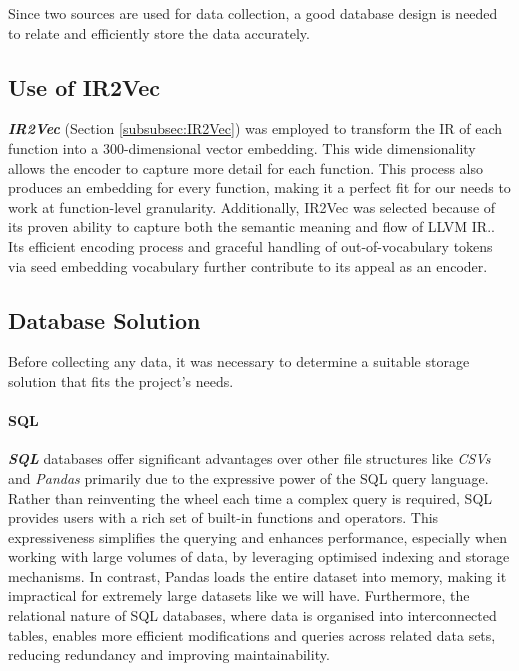 Since two sources are used for data collection, a good database design is needed to relate and efficiently store the data accurately.

\subsection{Use of IR2Vec} \label{subsection:UseOfIR2Vec}
\textbf{\textit{IR2Vec}} (Section \ref{subsubsec:IR2Vec}) was employed to transform the IR of each function into a 300-dimensional vector embedding. This wide dimensionality allows the encoder to capture more detail for each function. This process also produces an embedding for every function, making it a perfect fit for our needs to work at function-level granularity. Additionally, IR2Vec was selected because of its proven ability to capture both the semantic meaning and flow of LLVM IR.\cite{IR2Vec}. Its efficient encoding process and graceful handling of out-of-vocabulary tokens via seed embedding vocabulary further contribute to its appeal as an encoder. 



\subsection{Database Solution}
Before collecting any data, it was necessary to determine a suitable storage solution that fits the project's needs.

\paragraph{SQL} \textbf{\textit{SQL}} databases offer significant advantages over other file structures like \textit{CSVs} and \textit{Pandas} primarily due to the expressive power of the SQL query language. Rather than reinventing the wheel each time a complex query is required, SQL provides users with a rich set of built-in functions and operators. This expressiveness simplifies the querying and enhances performance, especially when working with large volumes of data, by leveraging optimised indexing and storage mechanisms. In contrast, Pandas loads the entire dataset into memory, making it impractical for extremely large datasets like we will have. Furthermore, the relational nature of SQL databases, where data is organised into interconnected tables, enables more efficient modifications and queries across related data sets, reducing redundancy and improving maintainability.

